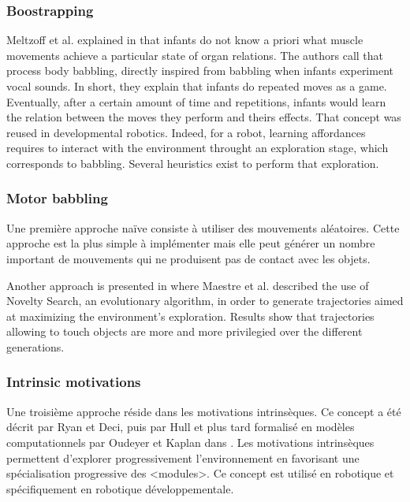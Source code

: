 \documentclass{llncs}
\begin{document}
\subsubsection{Boostrapping}
Meltzoff et al. explained in \cite{EDP:EDP157} that infants do not know a priori what muscle movements achieve a particular state of organ relations. The authors call that process body babbling, directly inspired from babbling when infants experiment vocal sounds. In short, they explain that infants do repeated moves as a game. Eventually, after a certain amount of time and repetitions, infants would learn the relation between the moves they perform and theirs effects. That concept was reused in developmental robotics. Indeed, for a robot, learning affordances requires to interact with the environment throught an exploration stage, which corresponds to babbling. Several heuristics exist to perform that exploration.

\subsubsection{Motor babbling}
Une première approche naïve consiste à utiliser des mouvements aléatoires. Cette approche est la plus simple à implémenter mais elle peut générer un nombre important de mouvements qui ne produisent pas de contact avec les objets.

Another approach is presented in \cite{Maestre2015} where Maestre et al. described the use of Novelty Search, an evolutionary algorithm, in order to generate trajectories aimed at maximizing the environment's exploration. Results show that trajectories allowing to touch objects are more and more privilegied over the different generations.

\subsubsection{Intrinsic motivations}
Une troisième approche réside dans les motivations intrinsèques. Ce concept a été décrit par Ryan et Deci, puis par Hull et plus tard formalisé en modèles computationnels par Oudeyer et Kaplan dans \cite{10.3389/neuro.12.006.2007}. Les motivations intrinsèques permettent d'explorer progressivement l'environnement en favorisant une spécialisation progressive des <modules>. Ce concept est utilisé en robotique et spécifiquement en robotique développementale.

\end{document}
